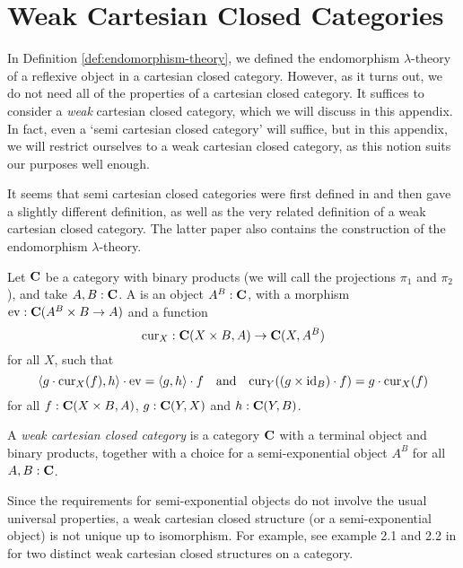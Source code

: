 \chapter{Weak Cartesian Closed Categories}\label{ch:weak-cartesian-closed-categories}
In Definition \ref{def:endomorphism-theory}, we defined the endomorphism $ \lambda $-theory of a reflexive object in a cartesian closed category. However, as it turns out, we do not need all of the properties of a cartesian closed category. It suffices to consider a \textit{weak} cartesian closed category, which we will discuss in this appendix. In fact, even a `semi cartesian closed category' will suffice, but in this appendix, we will restrict ourselves to a weak cartesian closed category, as this notion suits our purposes well enough.

It seems that semi cartesian closed categories were first defined in \autocite{hayashi-1985-semifunctors} and then \autocite{hoofman-1993-semi-cartesian-closed} gave a slightly different definition, as well as the very related definition of a weak cartesian closed category. The latter paper also contains the construction of the endomorphism $ \lambda $-theory.

\begin{definition}
  Let $ \mathbf{C} $ be a category with binary products (we will call the projections $ \pi_1 $ and $ \pi_2 $), and take $ A, B : \mathbf{C} $. A  is an object $ A^B : \mathbf{C} $, with a morphism $ \mathrm{ev}: \mathbf{C}(A^B \times B \to A) $ and a function
  \[ \mathrm{cur}_X: \mathbf{C}(X \times B, A) \to \mathbf{C}(X, A^B) \]
  for all $ X $, such that
  \[ \langle g \cdot \mathrm{cur}_X(f), h \rangle \cdot \mathrm{ev} = \langle g, h \rangle \cdot f \quad \text{and} \quad \mathrm{cur}_Y((g \times \text{id}_{B}) \cdot f) = g \cdot \mathrm{cur}_X(f) \]
  for all $ f: \mathbf{C}(X \times B, A) $, $ g : \mathbf{C}(Y, X) $ and $ h : \mathbf{C}(Y, B) $.
\end{definition}

\begin{definition}
  A \textit{weak cartesian closed category} is a category $ \mathbf{C} $ with a terminal object and binary products, together with a choice for a semi-exponential object $ A^B $ for all $ A, B : \mathbf{C} $.
\end{definition}

\begin{remark}
  Since the requirements for semi-exponential objects do not involve the usual universal properties, a weak cartesian closed structure (or a semi-exponential object) is not unique up to isomorphism. For example, see example 2.1 and 2.2 in \autocite{hoofman-1993-semi-cartesian-closed} for two distinct weak cartesian closed structures on a category.
\end{remark}

